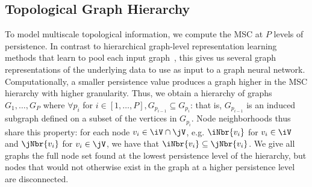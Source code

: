 \subsection{Topological Graph Hierarchy}
\label{ssec:topohier}

To model multiscale topological information, we compute the MSC at $P$ levels of persistence. In contrast to hierarchical graph-level representation learning methods that learn to pool each input graph~\cite{ying2018hierarchical}, this gives us several graph representations of the underlying data to use as input to a graph neural network. Computationally, a smaller persistence value produces a graph higher in the MSC hierarchy with higher granularity.  Thus, we obtain a hierarchy of graphs $G_1, \ldots, G_P$ where  $\forall p_i$ for $i \in [1, \ldots, P], G_{p_{i-1}} \subseteq G_{p_i}$: that is, $G_{p_{i-1}}$ is an induced subgraph defined on a subset of the vertices in $G_{p_i}$. %
Node neighborhoods thus share this property: for each node $v_i \in \iV \cap \jV$, e.g. $\iNbr{v_i}$ for $v_i \in \iV$ and $\jNbr{v_i}$ for $v_i \in \jV$, we have that $\iNbr{v_i} \subseteq \jNbr{v_i}$. %
We give all graphs the full node set found at the lowest persistence level of the hierarchy, but nodes that would not otherwise exist in the graph at a higher persistence level are disconnected.%

